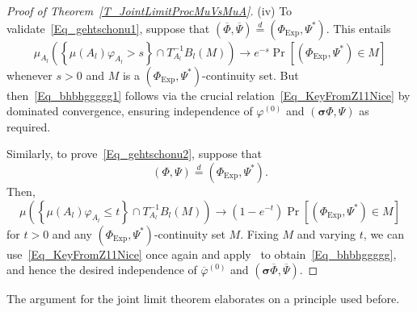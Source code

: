 \documentclass[10pt]{amsart}
\theoremstyle{definition}\newtheorem{defi}[theo]{Definition}\newtheorem{rema}[theo]{Remark}\newtheorem{exam}[theo]{Example}\newtheorem{exem}[theo]{Example}\newtheorem{nota}[theo]{Notation}
\newcommand{\Expl}{\mathrm{Exp}}
\newcommand{\bfsig}{\boldsymbol{\sigma}}
\begin{document}
\begin{proof}[{Proof of Theorem~\ref{T_JointLimitProcMuVsMuA}}]
\noindent (iv) To validate~\eqref{Eq_gehtschonu1}, suppose that $(\overline{\Phi},\overline{\Psi})\overset{d}{=}(\Phi_{\Expl},\Psi^{\ast})$. This entails
\[
\mu_{A_{l}}\left(\left\{\mu(A_{l})\varphi_{A_{l}}>s\right\}\cap T_{A_{l}}^{-1} B_{l}(M)\right) \longrightarrow e^{-s}\Pr\left[\left(\Phi_{\Expl},\Psi^{\ast}\right)\in M\right]
\]
whenever $s>0$ and $M$ is a $(\Phi_{\Expl},\Psi^{\ast})$-continuity set. But then~\eqref{Eq_bhbhggggg1} follows via the crucial relation~\eqref{Eq_KeyFromZ11Nice} by dominated convergence, ensuring independence of $\varphi^{(0)}$ and $(\bfsig\Phi,\Psi)$ as required.


Similarly, to prove~\eqref{Eq_gehtschonu2}, suppose that
\[
(\Phi,\Psi)\overset{d}{=}\left(\Phi_{\Expl},\Psi^{\ast}\right).
\]
Then,
\[
\mu\left(\left\{\mu(A_{l})\varphi_{A_{l}}\leq t\right\}\cap T_{A_{l}}^{-1} B_{l}(M)\right) \longrightarrow\left(1-e^{-t}\right)\Pr\left[\left(\Phi_{\Expl},\Psi^{\ast}\right)\in M\right]
\]
for $t>0$ and any $(\Phi_{\Expl},\Psi^{\ast})$-continuity set $M$. Fixing $M$ and varying $t$, we can use~\eqref{Eq_KeyFromZ11Nice} once again and apply~\cite[Lemma~4.2]{Z11} to obtain~\eqref{Eq_bhbhggggg}, and hence the desired independence of $\overline{\varphi}^{(0)}$ and $(\bfsig\overline{\Phi},\overline{\Psi})$.
\end{proof}


The argument for the joint limit theorem elaborates on a principle used before.
\end{document}
